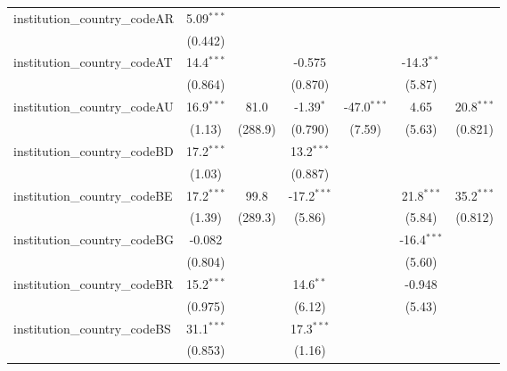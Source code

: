 \begin{tabular}{lcccccc}
   institution\_country\_codeAR          & 5.09$^{***}$  &              &               &               &               &   \\   
                                         & (0.442)       &              &               &               &               &   \\   
   institution\_country\_codeAT          & 14.4$^{***}$  &              & -0.575        &               & -14.3$^{**}$  &   \\   
                                         & (0.864)       &              & (0.870)       &               & (5.87)        &   \\   
   institution\_country\_codeAU          & 16.9$^{***}$  & 81.0         & -1.39$^{*}$   & -47.0$^{***}$ & 4.65          & 20.8$^{***}$\\   
                                         & (1.13)        & (288.9)      & (0.790)       & (7.59)        & (5.63)        & (0.821)\\   
   institution\_country\_codeBD          & 17.2$^{***}$  &              & 13.2$^{***}$  &               &               &   \\   
                                         & (1.03)        &              & (0.887)       &               &               &   \\   
   institution\_country\_codeBE          & 17.2$^{***}$  & 99.8         & -17.2$^{***}$ &               & 21.8$^{***}$  & 35.2$^{***}$\\   
                                         & (1.39)        & (289.3)      & (5.86)        &               & (5.84)        & (0.812)\\   
   institution\_country\_codeBG          & -0.082        &              &               &               & -16.4$^{***}$ &   \\   
                                         & (0.804)       &              &               &               & (5.60)        &   \\   
   institution\_country\_codeBR          & 15.2$^{***}$  &              & 14.6$^{**}$   &               & -0.948        &   \\   
                                         & (0.975)       &              & (6.12)        &               & (5.43)        &   \\   
   institution\_country\_codeBS          & 31.1$^{***}$  &              & 17.3$^{***}$  &               &               &   \\   
                                         & (0.853)       &              & (1.16)        &               &               &   \\   

\end{tabular}
